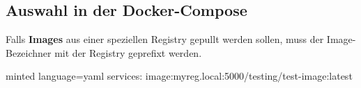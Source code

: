 \subsection{Auswahl in der Docker-Compose}
\begin{frame}[fragile]
    \slidehead
    \Large
    \centering
    Falls \textbf{Images} aus einer speziellen Registry gepullt werden sollen, muss der Image-Bezeichner
    mit der Registry geprefixt werden.
    \vspace{1em}
    \normalsize
    \begin{codeBlock}{minted language=yaml}
        services:
        image:myreg.local:5000/testing/test-image:latest
    \end{codeBlock}
\end{frame}
